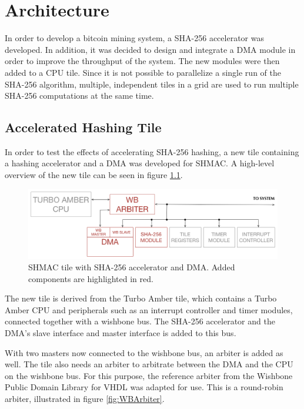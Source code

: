 \chapter{Architecture}
\label{cha:architecture}

In order to develop a bitcoin mining system, a SHA-256 accelerator was developed. In addition,
it was decided to design and integrate a DMA module in order to improve the throughput of
the system. The new modules were then added to a CPU tile. Since it is not possible
to parallelize a single run of the SHA-256 algorithm, multiple, independent tiles
in a grid are used to run multiple SHA-256 computations at the same time.

\section{Accelerated Hashing Tile}
\label{sec:aht}

In order to test the effects of accelerating SHA-256 hashing, a new tile containing a hashing
accelerator and a DMA was developed for SHMAC. A high-level overview of the new tile can be
seen in figure \ref{fig:SHA-Tile}.

\begin{figure}[htb]
    \centering
    \includegraphics[width=1.0\textwidth]{Figures/Tile/HashingTile}
    \caption{SHMAC tile with SHA-256 accelerator and DMA. Added components are highlighted in red.}
    \label{fig:SHA-Tile}
\end{figure}

The new tile is derived from the Turbo Amber tile, which contains
a Turbo Amber CPU and peripherals such as an interrupt controller and timer modules, connected
together with a wishbone bus.
The SHA-256 accelerator and the DMA's slave interface and master interface is added to this bus.

With two masters now connected to the wishbone bus, an arbiter is added as well.
The tile also needs an arbiter to arbitrate between the DMA and the CPU on the wishbone bus.
For this purpose, the reference arbiter from the Wishbone Public Domain Library for VHDL %
was adapted for use. This is a round-robin arbiter, illustrated in figure \ref{fig:WBArbiter}.

